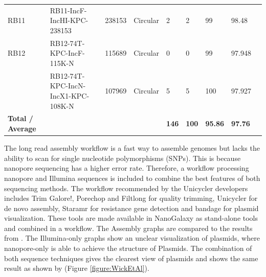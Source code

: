 \documentclass[a4paper,num-refs]{oup-contemporary}
\begin{document}
\begin{landscape}
\begin{table}
\begin{tabular}{l l l l l l l l l}
RB11                     & RB11-IncF-IncHI-KPC-238153         & 238153        & Circular            & 2                                & 2                                        & 99                & 98.48             &                   \\
RB12                     & RB12-74T-KPC-IncF-115K-N           & 115689        & Circular            & 0                                & 0                                        & 99                & 97.948            &                   \\
                         & RB12-74T-KPC-IncN-IncX1-KPC-108K-N & 107969        & Circular            & 5                                & 5                                        & 100               & 97.927            &                   \\
\midrule
\textbf{Total / Average} & \textbf{}                          & \textbf{}     & \textbf{}           & \textbf{146}                     & \textbf{100}                             & \textbf{95.86}    & \textbf{97.76}    & \textbf{}        \\
\bottomrule
\end{tabular}
\end{table}
\end{landscape}

The long read assembly workflow is a fast way to assemble genomes but lacks the ability to scan for single nucleotide polymorphisms (SNPs). This is because nanopore sequencing has a higher error rate. Therefore, a workflow processing nanopore and Illumina sequences is included to combine the best features of both sequencing methods. The workflow recommended by the Unicycler developers \cite{Wick2017} includes Trim Galore!, Porechop and Filtlong for quality trimming, Unicycler for de novo assembly, Staramr for resistance gene detection and bandage for plasmid visualization. These tools are made available in NanoGalaxy as stand-alone tools and combined in a workflow. The Assembly graphs are compared to the results from \citet{Wick2017}. The Illumina-only graphs show an unclear visualization of plasmids, where nanopore-only is able to achieve the structure of Plasmids. The combination of both sequence techniques gives the clearest view of plasmids and shows the same result as shown by \citet{Wick2017} (Figure \ref{figure:WickEtAl}).
\end{document}
